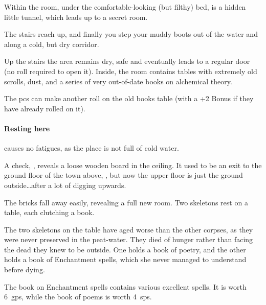 Within the room, under the comfortable-looking (but filthy) bed, is a hidden little tunnel, which leads up to a secret room.

\begin{boxtext}
  The stairs reach up, and finally you step your muddy boots out of the water and along a cold, but dry corridor.
\end{boxtext}


Up the stairs the area remains dry, safe and eventually leads to a regular door (no roll required to open it).
Inside, the room contains tables with extremely old scrolls, dust, and a series of very out-of-date books on alchemical theory.

The \glspl{pc} can make another roll on the old books table  (with a +2 Bonus if they have already rolled on it).

\paragraph{Resting here}
causes no \glspl{fatigue}, as the place is not full of cold water.

A  check, \tn[10], reveals a loose wooden board in the ceiling.
It used to be an exit to the ground floor of the town above, , but now the upper floor is just the ground outside\ldots after a lot of digging upwards.

\begin{boxtext}

  The bricks fall away easily, revealing a full new room.  Two skeletons rest on a table, each clutching a book.

\end{boxtext}


\begin{exampletext}
  The two skeletons on the table have aged worse than the other corpses, as they were never preserved in the peat-water.
  They died of hunger rather than facing the dead they knew to be outside.
  One holds a book of poetry, and the other holds a book of Enchantment spells, which she never managed to understand before dying.
\end{exampletext}

The book on Enchantment spells contains various excellent spells.
It is worth 6~\glspl{gp}, while the book of poems is worth 4~\glspl{sp}.

